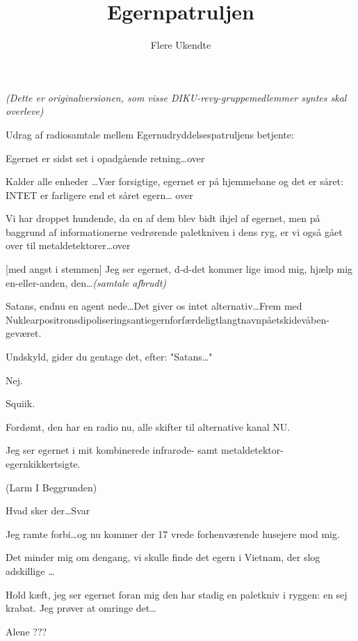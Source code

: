 \documentclass{article}
\title{Egernpatruljen}
\author{Flere Ukendte}
\begin{document}
\maketitle

{\sl(Dette er originalversionen, som visse DIKU-revy-gruppemedlemmer
  syntes skal overleve)}
\begin{sketch}
Udrag af radiosamtale mellem Egernudryddelsespatruljens betjente:

 Egernet er sidst set i opadgående retning\ldots  over

 Kalder alle enheder \ldots Vær forsigtige, egernet er på
hjemmebane og det er såret: INTET er farligere end et såret egern\ldots
over

 Vi har droppet hundende, da en af dem blev bidt ihjel af
egernet, men på baggrund af informationerne vedrørende paletkniven i dens
ryg, er vi også gået over til metaldetektorer\ldots over

[med angst i stemmen] Jeg ser egernet, d-d-det kommer lige
imod mig, hjælp mig en-eller-anden, den\ldots {\em (samtale afbrudt)}

 Satans, endnu en agent nede\ldots Det giver os intet
alternativ\ldots Frem med
Nuklear\-positrons\-dipoliserings\-anti\-egern\-forfærdeligt\-langt\-navn\-på\-et\-skide\-våben-geværet.

 Undskyld, gider du gentage det, efter: "Satans\ldots "

 Nej.

 Squiik.

 Fordømt, den har en radio nu, alle skifter til
alternative kanal NU.

 Jeg ser egernet i mit kombinerede infrarøde- samt
metal\-detek\-tor-egern\-kik\-kert\-sigte.

\scene (Larm I Beggrunden)

 Hvad sker der\ldots  Svar

 Jeg ramte forbi\ldots og nu kommer der 17 vrede
forhenværende husejere mod mig.

 Det minder mig om dengang, vi skulle finde det egern i
Vietnam, der slog adskillige \ldots

 Hold kæft, jeg ser egernet foran mig den har stadig en
paletkniv i ryggen: en sej krabat. Jeg prøver at omringe det\ldots

 Alene ???


\end{sketch}
\end{document}
